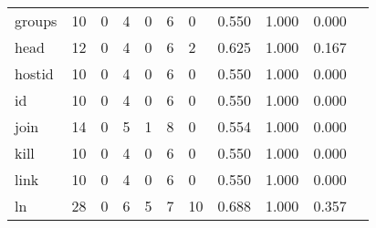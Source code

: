 \begin{longtable}{lp{1.10cm}p{1.10cm}p{1.10cm}p{1.10cm}p{1.10cm}p{1.10cm}p{1.10cm}p{1.10cm}p{1.10cm}p{1.10cm}}
groups    &                     10 &                                  0 &                                 4 &                                0 &                                 6 &                               0 &                          0.550 &                                 1.000 &                               0.000 \\
head      &                     12 &                                  0 &                                 4 &                                0 &                                 6 &                               2 &                          0.625 &                                 1.000 &                               0.167 \\
hostid    &                     10 &                                  0 &                                 4 &                                0 &                                 6 &                               0 &                          0.550 &                                 1.000 &                               0.000 \\
id        &                     10 &                                  0 &                                 4 &                                0 &                                 6 &                               0 &                          0.550 &                                 1.000 &                               0.000 \\
join      &                     14 &                                  0 &                                 5 &                                1 &                                 8 &                               0 &                          0.554 &                                 1.000 &                               0.000 \\
kill      &                     10 &                                  0 &                                 4 &                                0 &                                 6 &                               0 &                          0.550 &                                 1.000 &                               0.000 \\
link      &                     10 &                                  0 &                                 4 &                                0 &                                 6 &                               0 &                          0.550 &                                 1.000 &                               0.000 \\
ln        &                     28 &                                  0 &                                 6 &                                5 &                                 7 &                              10 &                          0.688 &                                 1.000 &                               0.357 \\

\end{longtable}
